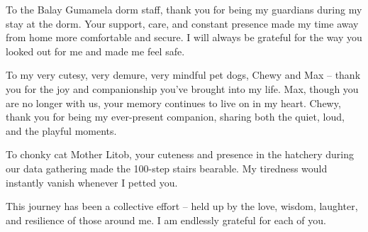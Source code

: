 To the Balay Gumamela dorm staff, thank you for being my guardians during my stay at the dorm. Your support, care, and constant presence made my time away from home more comfortable and secure. I will always be grateful for the way you looked out for me and made me feel safe.

To my very cutesy, very demure, very mindful pet dogs, Chewy and Max – thank you for the joy and companionship you’ve brought into my life. Max, though you are no longer with us, your memory continues to live on in my heart. Chewy, thank you for being my ever-present companion, sharing both the quiet, loud, and the playful moments.

To chonky cat Mother Litob, your cuteness and presence in the hatchery during our data gathering made the 100-step stairs bearable. My tiredness would instantly vanish whenever I petted you.

This journey has been a collective effort – held up by the love, wisdom, laughter, and resilience of those around me. I am endlessly grateful for each of you.



